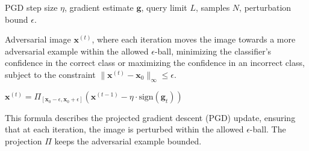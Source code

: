 
PGD step size $\eta$, gradient estimate $\mathbf{g}$, query limit $L$, samples $N$, perturbation bound $\epsilon$.

Adversarial image $\mathbf{x}^{(t)}$, where each iteration moves the image towards a more adversarial example within the allowed $\epsilon$-ball, minimizing the classifier's confidence in the correct class or maximizing the confidence in an incorrect class, subject to the constraint $\|\mathbf{x}^{(t)} - \mathbf{x}_0\|_\infty \leq \epsilon$.

$\mathbf{x}^{(t)} = \Pi_{[\mathbf{x}_0 - \epsilon, \mathbf{x}_0 + \epsilon]}\left(\mathbf{x}^{(t-1)} - \eta \cdot \text{sign}(\mathbf{g}_t)\right)$

This formula describes the projected gradient descent (PGD) update, ensuring that at each iteration, the image is perturbed within the allowed $\epsilon$-ball. The projection $\Pi$ keeps the adversarial example bounded.